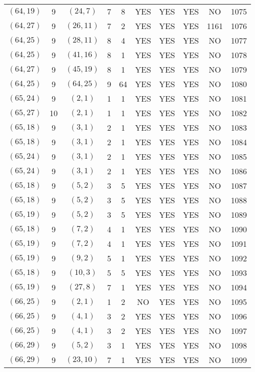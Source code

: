 \begin{longtable}{|c|c|c|c|c|c|c|c|c|c|}
$(64, 19)$ & 9 & $(24, 7)$ & 7 & 8 & YES & YES & YES & NO & 1075\\
$(64, 27)$ & 9 & $(26, 11)$ & 7 & 2 & YES & YES & YES & 1161 & 1076\\
$(64, 25)$ & 9 & $(28, 11)$ & 8 & 4 & YES & YES & YES & NO & 1077\\
$(64, 25)$ & 9 & $(41, 16)$ & 8 & 1 & YES & YES & YES & NO & 1078\\
$(64, 27)$ & 9 & $(45, 19)$ & 8 & 1 & YES & YES & YES & NO & 1079\\
$(64, 25)$ & 9 & $(64, 25)$ & 9 & 64 & YES & YES & YES & NO & 1080\\
$(65, 24)$ & 9 & $(2, 1)$ & 1 & 1 & YES & YES & YES & NO & 1081\\
$(65, 27)$ & 10 & $(2, 1)$ & 1 & 1 & YES & YES & YES & NO & 1082\\
$(65, 18)$ & 9 & $(3, 1)$ & 2 & 1 & YES & YES & YES & NO & 1083\\
$(65, 18)$ & 9 & $(3, 1)$ & 2 & 1 & YES & YES & YES & NO & 1084\\
$(65, 24)$ & 9 & $(3, 1)$ & 2 & 1 & YES & YES & YES & NO & 1085\\
$(65, 24)$ & 9 & $(3, 1)$ & 2 & 1 & YES & YES & YES & NO & 1086\\
$(65, 18)$ & 9 & $(5, 2)$ & 3 & 5 & YES & YES & YES & NO & 1087\\
$(65, 18)$ & 9 & $(5, 2)$ & 3 & 5 & YES & YES & YES & NO & 1088\\
$(65, 19)$ & 9 & $(5, 2)$ & 3 & 5 & YES & YES & YES & NO & 1089\\
$(65, 18)$ & 9 & $(7, 2)$ & 4 & 1 & YES & YES & YES & NO & 1090\\
$(65, 19)$ & 9 & $(7, 2)$ & 4 & 1 & YES & YES & YES & NO & 1091\\
$(65, 19)$ & 9 & $(9, 2)$ & 5 & 1 & YES & YES & YES & NO & 1092\\
$(65, 18)$ & 9 & $(10, 3)$ & 5 & 5 & YES & YES & YES & NO & 1093\\
$(65, 19)$ & 9 & $(27, 8)$ & 7 & 1 & YES & YES & YES & NO & 1094\\
$(66, 25)$ & 9 & $(2, 1)$ & 1 & 2 & NO & YES & YES & NO & 1095\\
$(66, 25)$ & 9 & $(4, 1)$ & 3 & 2 & YES & YES & YES & NO & 1096\\
$(66, 25)$ & 9 & $(4, 1)$ & 3 & 2 & YES & YES & YES & NO & 1097\\
$(66, 29)$ & 9 & $(5, 2)$ & 3 & 1 & YES & YES & YES & NO & 1098\\
$(66, 29)$ & 9 & $(23, 10)$ & 7 & 1 & YES & YES & YES & NO & 1099\\

\end{longtable}
